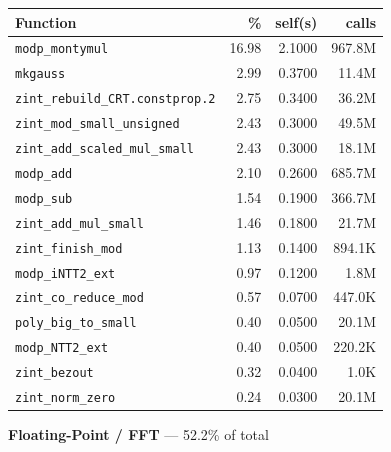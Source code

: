 \documentclass[11pt,a4paper]{article}
\begin{document}
\begin{longtable}{p{7.5cm}rrr}
\toprule
Function & \% & self(s) & calls \\
\midrule
\endhead
  \texttt{modp\_montymul} & 16.98 & 2.1000 & 967.8M \\
  \texttt{mkgauss} & 2.99 & 0.3700 & 11.4M \\
  \texttt{zint\_rebuild\_CRT.constprop.2} & 2.75 & 0.3400 & 36.2M \\
  \texttt{zint\_mod\_small\_unsigned} & 2.43 & 0.3000 & 49.5M \\
  \texttt{zint\_add\_scaled\_mul\_small} & 2.43 & 0.3000 & 18.1M \\
  \texttt{modp\_add} & 2.10 & 0.2600 & 685.7M \\
  \texttt{modp\_sub} & 1.54 & 0.1900 & 366.7M \\
  \texttt{zint\_add\_mul\_small} & 1.46 & 0.1800 & 21.7M \\
  \texttt{zint\_finish\_mod} & 1.13 & 0.1400 & 894.1K \\
  \texttt{modp\_iNTT2\_ext} & 0.97 & 0.1200 & 1.8M \\
  \texttt{zint\_co\_reduce\_mod} & 0.57 & 0.0700 & 447.0K \\
  \texttt{poly\_big\_to\_small} & 0.40 & 0.0500 & 20.1M \\
  \texttt{modp\_NTT2\_ext} & 0.40 & 0.0500 & 220.2K \\
  \texttt{zint\_bezout} & 0.32 & 0.0400 & 1.0K \\
  \texttt{zint\_norm\_zero} & 0.24 & 0.0300 & 20.1M \\
\bottomrule
\end{longtable}

\noindent\colorbox{fpcolor}{\strut \textbf{Floating-Point / FFT} --- 52.2\% of total}
\vspace{2pt}
\end{document}
